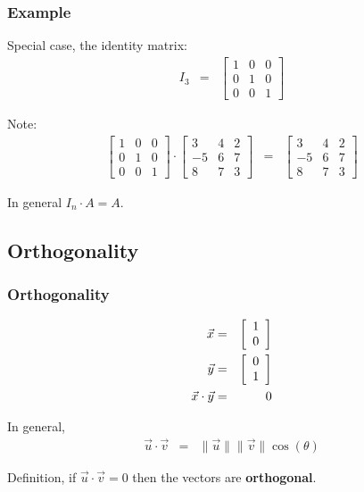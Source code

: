\begin{frame}
  \frametitle{Example}
  
  Special case, the identity matrix:
  \begin{eqnarray*}
    I_3 & = & 
    \left[
      \begin{array}{rrr}
        1 & 0 & 0\\
        0 & 1 & 0 \\
        0 & 0 & 1
      \end{array}
    \right]
  \end{eqnarray*}

  Note:
  \begin{eqnarray*}
    \left[
      \begin{array}{rrr}
        1 & 0 & 0 \\
        0 & 1 & 0 \\
        0 & 0 & 1
      \end{array}
    \right] \cdot
       \left[
      \begin{array}{rrr}
        3 & 4 & 2 \\
        -5 & 6 & 7 \\
        8 & 7 & 3
      \end{array}
    \right] & = & 
       \left[
      \begin{array}{rrr}
        3 & 4 & 2 \\
        -5 & 6 & 7 \\
        8 & 7 & 3
      \end{array}
    \right] 
  \end{eqnarray*}

  In general $I_n\cdot A = A$.

\end{frame}

\subsection{Orthogonality}

\begin{frame}
  \frametitle{Orthogonality}

  \begin{eqnarray*}
    \vec{x} & = & \left[ \begin{array}{r} 1 \\ 0 \end{array} \right] \\
    \vec{y} & = & \left[ \begin{array}{r} 0 \\ 1 \end{array} \right] \\
    \vec{x}\cdot\vec{y} & = & 0
  \end{eqnarray*}

  In general,
  \begin{eqnarray*}
    \vec{u}\cdot\vec{v} & = & \| \vec{u} \| \| \vec{v} \| \cos(\theta)
  \end{eqnarray*}

  Definition, if $\vec{u}\cdot\vec{v}=0$ then the vectors are \textbf{orthogonal}.
  
\end{frame}

